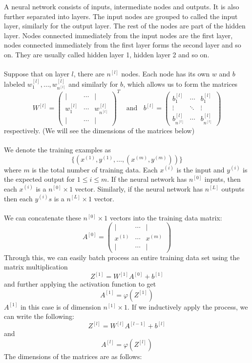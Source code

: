\documentclass[a4paper]{article}
\begin{document}
A neural network consists of inputs, intermediate nodes and outputs. It is also further separated into layers. The input nodes are grouped to called the input layer, similarly for the output layer. The rest of the nodes are part of the hidden layer. Nodes connected immediately from the input nodes are the first layer, nodes connected immediately from the first layer forms the second layer and so on. They are usually called hidden layer 1, hidden layer 2 and so on. \\~\\

Suppose that on layer $l$, there are $n^{[l]}$ nodes. Each node has its own $w$ and $b$ labeled $w_1^{[l]},\dots,w_{n^{[l]}}^{[l]}$ and similarly for $b$, which allows us to form the matrices $$W^{[l]}=\begin{pmatrix}
| & \cdots & |\\
w_1^{[l]} & \cdots & w_{n^{[l]}}^{[l]}\\
| & \cdots & |
\end{pmatrix}^T\;\;\text{ and }\;\;b^{[l]}=\begin{pmatrix}
b_1^{[l]} & \cdots & b_1^{[l]}\\
\vdots & \ddots & \vdots\\
b_{n^{[l]}}^{[l]} & \cdots & b_{n^{[l]}}^{[l]}
\end{pmatrix}$$ respectively. (We will see the dimensions of the matrices below) \\~\\

We denote the training examples as $$\{(x^{(1)}, y^{(1)},\dots,(x^{(m)},y^{(m)}))\}$$ where $m$ is the total number of training data. Each $x^{(i)}$ is the input and $y^{(i)}$ is the expected output for $1\leq i\leq m$. If the neural network has $n^{[0]}$ inputs, then each $x^{(i)}$ is a $n^{[0]}\times 1$ vector. Similarly, if the neural network has $n^{[L]}$ outputs then each $y^{(i)}s$ is a $n^{[L]}\times 1$ vector. \\~\\

We can concatenate these $n^{[0]}\times 1$ vectors into the training data matrix: $$A^{[0]}=\begin{pmatrix}
| & \cdots & |\\
x^{(1)} & \cdots & x^{(m)}\\
| & \cdots & |
\end{pmatrix}$$ Through this, we can easily batch process an entire training data set using the matrix multiplication $$Z^{[1]}=W^{[1]}A^{[0]}+b^{[1]}$$ and further applying the activation function to get $$A^{[1]}=\varphi(Z^{[1]})$$ $A^{[1]}$ in this case is of dimension $n^{[1]}\times 1$. If we inductively apply the process, we can write the following: $$Z^{[l]}=W^{[l]}A^{[l-1]}+b^{[l]}$$ and $$A^{[l]}=\varphi(Z^{[l]})$$ The dimensions of the matrices are as follows: 
\end{document}

